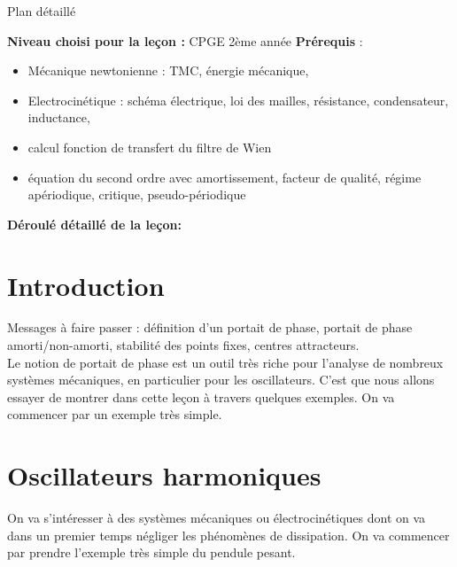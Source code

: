 \begin{reportBlock}{Plan détaillé}

  \textbf{Niveau choisi pour la leçon :} CPGE 2ème année
  \newline
  \textbf{Prérequis} : \begin{itemize}
      \item Mécanique newtonienne : TMC, énergie mécanique,
      \item Electrocinétique : schéma électrique, loi des mailles, résistance, condensateur, inductance,
      \item calcul fonction de transfert du filtre de Wien
      \item équation du second ordre avec amortissement, facteur de qualité, régime apériodique, critique, pseudo-périodique
  \end{itemize}

  \textbf{Déroulé détaillé de la leçon: }  
  
  \section*{Introduction}
Messages à faire passer : définition d'un portait de phase, portait de phase amorti/non-amorti, stabilité des points fixes, centres attracteurs.\\

Le notion de portait de phase est un outil très riche pour l'analyse de nombreux systèmes mécaniques, en particulier pour les oscillateurs. C'est que nous allons essayer de montrer dans cette leçon à travers quelques exemples. On va commencer par un exemple très simple.

  \section{Oscillateurs harmoniques}
  On va s'intéresser à des systèmes mécaniques ou électrocinétiques dont on va dans un premier temps négliger les phénomènes de dissipation. On va commencer par prendre l'exemple très simple du pendule pesant.

\end{reportBlock}
